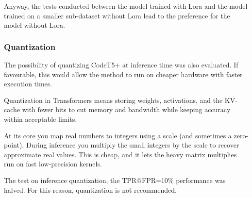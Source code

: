 Anyway, the tests conducted between the model trained with 
Lora and the model trained on a smaller sub-dataset without 
Lora lead to the preference for the model without Lora.

\subsubsection{Quantization}
The possibility of quantizing CodeT5+ at inference time was also evaluated. 
If favourable, this would allow the method to run on cheaper hardware with faster execution times.



Quantization in Transformers means storing weights, activations, 
and the KV-cache with fewer bits to cut memory and bandwidth while 
keeping accuracy within acceptable limits.

At its core you map real numbers to integers using a scale 
(and sometimes a zero-point). During inference you multiply 
the small integers by the scale to recover approximate real 
values. This is cheap, and it lets the heavy matrix multiplies 
run on fast low-precision kernels.

The test on inference quantization, the TPR@FPR=10\% 
performance was halved. For this 
reason, quantization is not recommended.

